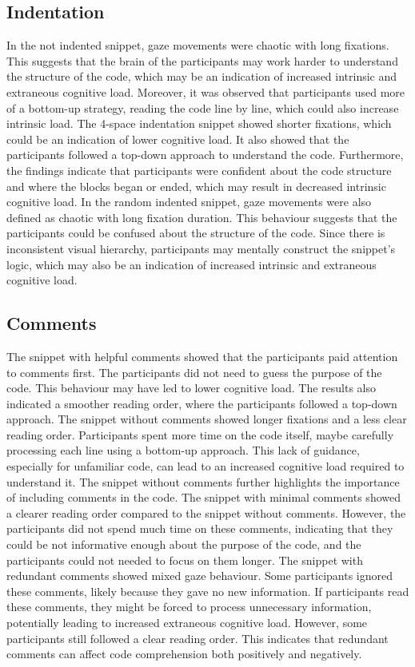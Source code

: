 \subsection{Indentation} 
In the not indented snippet, gaze movements were chaotic with long fixations. This suggests that the brain of the participants may work harder to understand the structure of the code, which may be an indication of increased intrinsic and extraneous cognitive load. Moreover, it was observed that participants used more of a bottom-up strategy, reading the code line by line, which could also increase intrinsic load.
The 4-space indentation snippet showed shorter fixations, which could be an indication of lower cognitive load. It also showed that the participants followed a top-down approach to understand the code. Furthermore, the findings indicate that participants were confident about the code structure and where the blocks began or ended, which may result in decreased intrinsic cognitive load.      
In the random indented snippet, gaze movements were also defined as chaotic with long fixation duration. This behaviour suggests that the participants could be confused about the structure of the code. Since there is inconsistent visual hierarchy, participants may mentally construct the snippet’s logic, which may also be an indication of increased intrinsic and extraneous cognitive load.    

\subsection{Comments} 
The snippet with helpful comments showed that the participants paid attention to comments first. The participants did not need to guess the purpose of the code. This behaviour may have led to lower cognitive load.  The results also indicated a smoother reading order, where the participants followed a top-down approach.
The snippet without comments showed longer fixations and a less clear reading order.  Participants spent more time on the code itself, maybe carefully processing each line using a bottom-up approach. This lack of guidance, especially for unfamiliar code, can lead to an increased cognitive load required to understand it.  The snippet without comments further highlights the importance of including comments in the code. The snippet with minimal comments showed a clearer reading order compared to the snippet without comments. However, the participants did not spend much time on these comments, indicating that they could be not informative enough about the purpose of the code, and the participants could not needed to focus on them longer. 
The snippet with redundant comments showed mixed gaze behaviour.  Some participants ignored these comments, likely because they gave no new information. If participants read these comments, they might be forced to process unnecessary information, potentially leading to increased extraneous cognitive load.  However, some participants still followed a clear reading order. This indicates that redundant comments can affect code comprehension both positively and negatively.  



